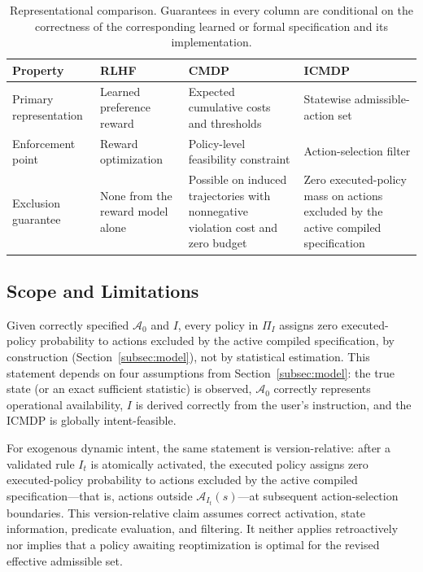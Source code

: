 \documentclass[journal]{IEEEtran}
\theoremstyle{definition}
\newcommand{\cA}{\mathcal{A}}
\begin{document}
\begin{table}[!t]
\centering
\caption{Representational comparison. Guarantees in every column are
conditional on the correctness of the corresponding learned or formal
specification and its implementation.}
\label{tab:comparison}

\scriptsize
\setlength{\tabcolsep}{4pt}
\renewcommand{\arraystretch}{1.15}

\begin{tabular}{
>{\raggedright\arraybackslash}p{2.6cm}
>{\raggedright\arraybackslash}p{4.2cm}
>{\raggedright\arraybackslash}p{4.8cm}
>{\raggedright\arraybackslash}p{4.8cm}
}
\toprule
\textbf{Property}
&
\textbf{RLHF}
&
\textbf{CMDP}
&
\textbf{ICMDP}
\\
\midrule

Primary representation
&
Learned preference reward
&
Expected cumulative costs and thresholds
&
Statewise admissible-action set
\\

Enforcement point
&
Reward optimization
&
Policy-level feasibility constraint
&
Action-selection filter
\\

Exclusion guarantee
&
None from the reward model alone
&
Possible on induced trajectories with nonnegative violation cost and zero budget
&
Zero executed-policy mass on actions excluded by the active compiled specification
\\

\bottomrule
\end{tabular}
\end{table}

\FloatBarrier
\subsection{Scope and Limitations}
\label{subsec:guarantees}

Given correctly specified $\cA_0$ and $I$, every policy in $\Pi_I$ assigns
zero executed-policy probability to actions excluded by the active compiled
specification, by construction
(Section~\ref{subsec:model}), not by statistical estimation. This statement
depends on four assumptions from
Section~\ref{subsec:model}: the true state (or an exact sufficient statistic)
is observed, $\cA_0$ correctly represents operational availability,
$I$ is derived correctly from the user's instruction, and the
ICMDP is globally intent-feasible.

For exogenous dynamic intent, the same statement is version-relative:
after a validated rule $I_t$ is atomically activated, the executed policy
assigns zero executed-policy probability to actions excluded by the active
compiled specification---that is, actions outside
$\cA_{I_t}(s)$---at subsequent
action-selection boundaries. This version-relative claim assumes correct activation, state
information, predicate evaluation, and filtering. It neither applies
retroactively nor implies that a policy awaiting reoptimization is optimal for
the revised effective admissible set.
\end{document}
